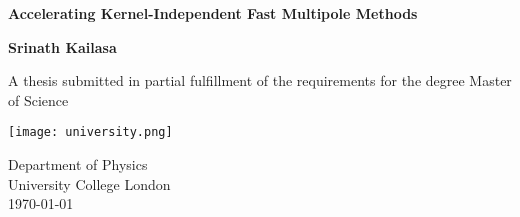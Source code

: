 \begin{titlepage}
    \begin{center}
        \vspace*{1cm}
        
        \Huge
        \textbf{Accelerating Kernel-Independent Fast Multipole Methods}
        
        \Large
        \vspace{0.5cm}
             
        \vfill
 
        \textbf{Srinath Kailasa}
 
        \vspace{5cm}
             
        A thesis submitted in partial fulfillment of the requirements for the 
        degree Master of Science
             
        \vspace{0.8cm}
      
        \texttt{[image: university.png]}
        
        \large
        Department of Physics\\
        University College London\\
        \today
             
    \end{center}
 \end{titlepage}